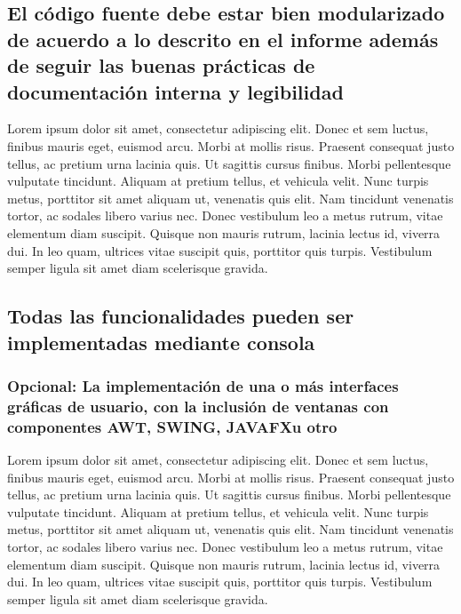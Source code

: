 \subsection{El código fuente debe estar bien modularizado de acuerdo a lo descrito en el informe además de seguir las buenas prácticas de documentación interna y legibilidad}

Lorem ipsum dolor sit amet, consectetur adipiscing elit. Donec et sem luctus, finibus mauris eget, euismod arcu. Morbi at mollis risus. Praesent consequat justo tellus, ac pretium urna lacinia quis. Ut sagittis cursus finibus. Morbi pellentesque vulputate tincidunt. Aliquam at pretium tellus, et vehicula velit. Nunc turpis metus, porttitor sit amet aliquam ut, venenatis quis elit. Nam tincidunt venenatis tortor, ac sodales libero varius nec. Donec vestibulum leo a metus rutrum, vitae elementum diam suscipit. Quisque non mauris rutrum, lacinia lectus id, viverra dui. In leo quam, ultrices vitae suscipit quis, porttitor quis turpis. Vestibulum semper ligula sit amet diam scelerisque gravida.

\subsection{Todas las funcionalidades pueden ser implementadas mediante consola}

\subsubsection*{Opcional: La implementación de una o más interfaces gráficas de usuario, con la inclusión de ventanas con componentes AWT, SWING, JAVAFXu otro}

Lorem ipsum dolor sit amet, consectetur adipiscing elit. Donec et sem luctus, finibus mauris eget, euismod arcu. Morbi at mollis risus. Praesent consequat justo tellus, ac pretium urna lacinia quis. Ut sagittis cursus finibus. Morbi pellentesque vulputate tincidunt. Aliquam at pretium tellus, et vehicula velit. Nunc turpis metus, porttitor sit amet aliquam ut, venenatis quis elit. Nam tincidunt venenatis tortor, ac sodales libero varius nec. Donec vestibulum leo a metus rutrum, vitae elementum diam suscipit. Quisque non mauris rutrum, lacinia lectus id, viverra dui. In leo quam, ultrices vitae suscipit quis, porttitor quis turpis. Vestibulum semper ligula sit amet diam scelerisque gravida.

